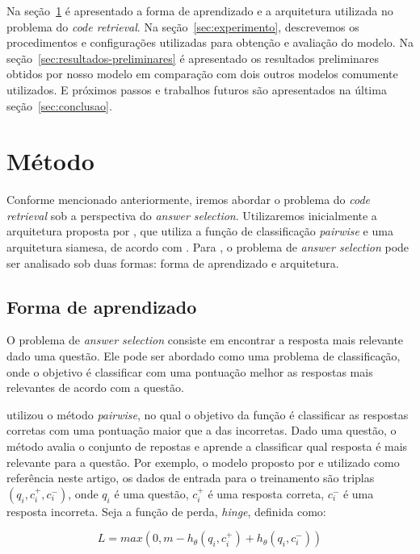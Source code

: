 \documentclass[12pt]{article}
\begin{document}
Na seção~\ref{sec:metodo} é apresentado a forma de aprendizado e a arquitetura utilizada no problema do \textit{code retrieval}. Na seção~\ref{sec:experimento}, descrevemos os procedimentos e configurações utilizadas para obtenção e avaliação do modelo. Na seção~\ref{sec:resultados-preliminares} é apresentado os resultados preliminares obtidos por nosso modelo em comparação com dois outros modelos comumente utilizados. E próximos passos e trabalhos futuros são apresentados na última seção~\ref{sec:conclusao}.


\section{Método} \label{sec:metodo}

Conforme mencionado anteriormente, iremos abordar o problema do \textit{code retrieval} sob a perspectiva do \textit{answer selection}. Utilizaremos inicialmente
a arquitetura proposta por \cite{tan-lstm-qa}, que utiliza a função de classificação \textit{pairwise} e uma arquitetura siamesa, de acordo com \cite{lai-etal-2018-review}. Para 
\cite{lai-etal-2018-review}, o problema de \textit{answer selection} pode ser analisado sob duas formas: forma de aprendizado e arquitetura.

\subsection{Forma de aprendizado}

O problema de \textit{answer selection} consiste em encontrar a resposta mais relevante dado uma questão. Ele pode ser abordado como uma problema de classificação, onde
o objetivo é classificar com uma pontuação melhor as respostas mais relevantes de acordo com a questão.

\cite{tan-lstm-qa} utilizou o método \textit{pairwise}, no qual o objetivo da função é classificar as respostas corretas com uma pontuação maior que a das incorretas. Dado uma questão,
o método avalia o conjunto de repostas e aprende a classificar qual resposta é mais relevante para a questão. Por exemplo, o modelo proposto por \cite{tan-lstm-qa} e utilizado como referência neste artigo, os dados de entrada para o treinamento
são triplas $(q_{i}, c_{i}^{+}, c_{i}^{-})$, onde $q_{i}$ é uma questão, $c_{i}^{+}$ é uma resposta correta, $c_{i}^{-}$ é uma resposta incorreta. Seja a função de perda, \textit{hinge}, definida como:

\begin{equation}
L = max(0, m - h_{\theta}(q_{i}, c_{i}^{+}) + h_{\theta}(q_{i}, c_{i}^{-}))   
\end{equation}
\end{document}
